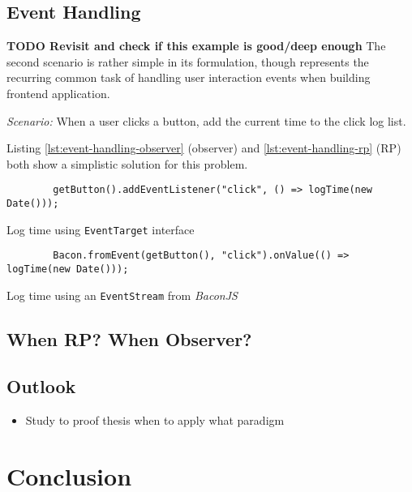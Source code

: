 \documentclass[12pt,a4paper]{article}
\begin{document}
\subsection{Event Handling}

\textbf{TODO Revisit and check if this example is good/deep enough} The second scenario is rather simple in its formulation, though represents the recurring common task of handling user interaction events when building frontend application.

\begin{framed}
	\noindent\emph{Scenario:} When a user clicks a button, add the current time to the click log list.
\end{framed}

Listing \ref{lst:event-handling-observer} (observer) and \ref{lst:event-handling-rp} (RP) both show a simplistic solution for this problem.

\begin{listing}[H]
	\begin{verbatim}
		getButton().addEventListener("click", () => logTime(new Date()));
	\end{verbatim}
	\caption{Log time using \texttt{EventTarget} interface}
	\label{lst:event-handling-observer}
\end{listing}

\begin{listing}[H]
	\begin{verbatim}
		Bacon.fromEvent(getButton(), "click").onValue(() => logTime(new Date()));
	\end{verbatim}
	\caption{Log time using an \texttt{EventStream} from \emph{BaconJS}}
	\label{lst:event-handling-rp}
\end{listing}

\subsection{When RP? When Observer?}

\subsection{Outlook}

\begin{itemize}
	\item Study to proof thesis when to apply what paradigm
\end{itemize}

\section{Conclusion}
\end{document}
